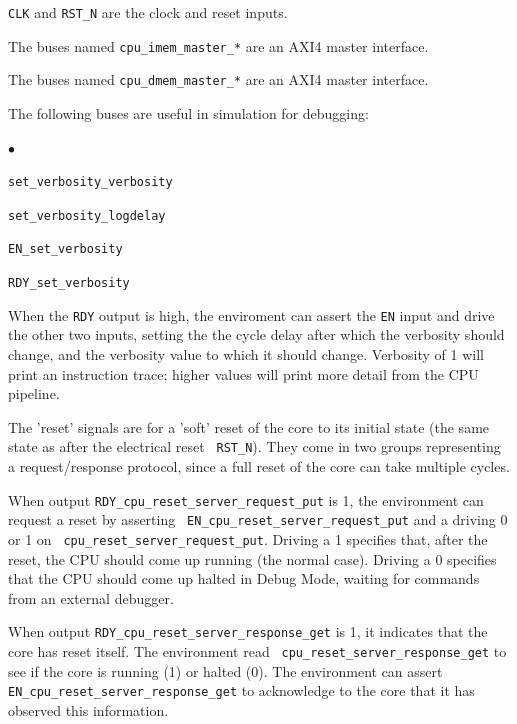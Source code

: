 \documentclass[11pt]{book}
\newenvironment{tightlist}%
{\begin{list}{$\bullet$}{%
    \setlength{\topsep}{0in}
    \setlength{\partopsep}{0in}
    \setlength{\itemsep}{0in}
    \setlength{\parsep}{0in}
    \setlength{\leftmargin}{1.5em}
    \setlength{\rightmargin}{0in}
    \setlength{\itemindent}{0in}
}
}%
{\end{list}
}
\newcommand{\cf}{\footnotesize\tt}
\begin{document}
\begin{itemize}

\item {\cf CLK} and {\cf RST\_N} are the clock and reset inputs.

\item The buses named {\cf cpu\_imem\_master\_*} are an AXI4 master interface.

\item The buses named {\cf cpu\_dmem\_master\_*} are an AXI4 master interface.

\item The following buses are useful in simulation for debugging:
  \begin{tightlist}
    \item {\cf set\_verbosity\_verbosity}
    \item {\cf set\_verbosity\_logdelay}
    \item {\cf EN\_set\_verbosity}
    \item {\cf RDY\_set\_verbosity}
  \end{tightlist}
  When the {\cf RDY} output is high, the enviroment can assert the
  {\cf EN} input and drive the other two inputs, setting the the cycle
  delay after which the verbosity should change, and the verbosity
  value to which it should change.  Verbosity of 1 will print an
  instruction trace; higher values will print more detail from the CPU
  pipeline.

\item The 'reset' signals are for a 'soft' reset of the core to its
  initial state (the same state as after the electrical reset {\cf
  RST\_N}).  They come in two groups representing a request/response
  protocol, since a full reset of the core can take multiple cycles.

  When output {\cf RDY\_cpu\_reset\_server\_request\_put} is 1, the
  environment can request a reset by asserting {\cf
  EN\_cpu\_reset\_server\_request\_put} and a driving 0 or 1 on {\cf
  cpu\_reset\_server\_request\_put}.  Driving a 1 specifies that,
  after the reset, the CPU should come up running (the normal case).
  Driving a 0 specifies that the CPU should come up halted in Debug
  Mode, waiting for commands from an external debugger.

  When output {\cf RDY\_cpu\_reset\_server\_response\_get} is 1, it
  indicates that the core has reset itself.  The environment read {\cf
  cpu\_reset\_server\_response\_get} to see if the core is running (1)
  or halted (0).  The environment can assert {\cf
  EN\_cpu\_reset\_server\_response\_get} to acknowledge to the core
  that it has observed this information.


\end{itemize}
\end{document}
